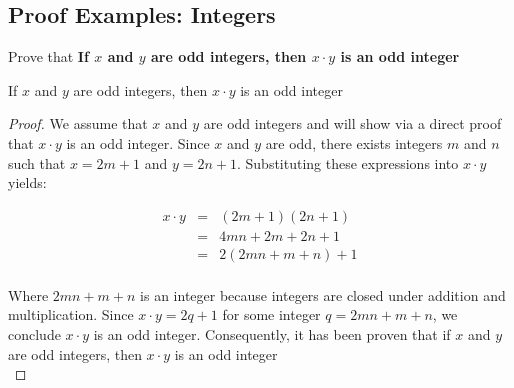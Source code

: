 \subsection{Proof Examples: Integers}
\begin{example}

Prove that {\bf If $x$ and $y$ are odd integers, then $x \cdot y$ is an odd integer} \\

\begin{tcolorbox}
	\begin{theorem}
		If $x$ and $y$ are odd integers, then $x \cdot y$ is an odd integer
	\end{theorem}
\end{tcolorbox}

\begin{proof}
We assume that $x$ and $y$ are odd integers and will show via a direct proof that $x \cdot y$ is an odd integer. Since $x$ and $y$ are odd, there exists integers $m$ and $n$ such that $x = 2m + 1$ and $y = 2n + 1$. Substituting these expressions into $x \cdot y$ yields:

\begin{eqnarray*}
	x \cdot y & = & (2m + 1)(2n + 1) \nonumber \\
	& = & 4mn + 2m + 2n + 1 \nonumber \\
	& = & 2(2mn + m + n) + 1 \nonumber \\
\end{eqnarray*}

Where $2mn + m + n$ is an integer because integers are closed under addition and multiplication. Since $x \cdot y = 2q + 1$ for some integer $q = 2mn + m + n$, we conclude $x \cdot y$ is an odd integer. Consequently, it has been proven that if $x$ and $y$ are odd integers, then $x \cdot y$ is an odd integer \\
\end{proof}
\end{example}


